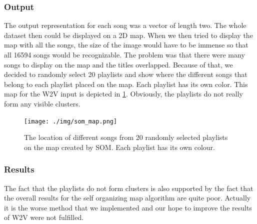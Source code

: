 \subsubsection{Output}
The output representation for each song was a vector of length two. The whole dataset then could be displayed on a 2D map. 
When we then tried to display the map with all the songs, the size of the image would have to be immense so that all 16594 songs would be recognizable. The problem was that there were many songs to display on the map and the titles overlapped. Because of that, we decided to randomly select 20 playlists and show where the different songs that belong to each playlist placed on the map. Each playlist has its own color. This map for the W2V input is depicted in \ref{fig:som_map}. Obviously, the playlists do not really form any visible clusters.
\begin{figure}[h]
    \centering
	\texttt{[image: ./img/som\_map.png]}
	\caption{The location of different songs from 20 randomly selected playlists on the map created by SOM. Each playlist has its own colour.}
	\label{fig:som_map}
\end{figure}
\subsubsection{Results}
The fact that the playlists do not form clusters is also supported by the fact that the overall results for the self organizing map algorithm are quite poor. Actually it is the worse method that we implemented and our hope to improve the results of W2V were not fulfilled.

